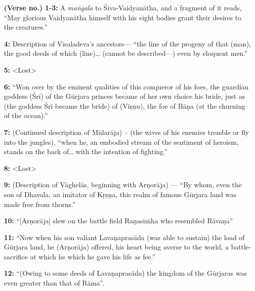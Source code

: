 \noindent
{\bf (Verse no.) 1-3:} A {\sl maṅgala} to Śiva-Vaidyanātha, and a fragment of it reads, “May glorious Vaidyanātha himself with his eight bodies grant their desires to the creatures.”

\noindent
{\bf 4:} Description of Vīsaladeva’s ancestors— “the line of the progeny of that (man), the good deeds of which (line)… (cannot be described—) even by eloquent men.”

\noindent
{\bf 5:} <Lost>

\vfill\eject

\smallskip
\noindent
{\bf 6:} “Won over by the eminent qualities of this conqueror of his foes, the guardian goddess (Śrī) of the Gūrjara princes became of her own choice his bride, just as (the goddess Śrī became the bride) of (Viṣṇu), the foe of Bāṇa (at the churning of the ocean).” 

\smallskip
\noindent
{\bf 7:} (Continued description of Mūlarāja) – (the wives of his enemies tremble or fly into the jungles), “when he, an embodied stream of the sentiment of heroism, stands on the back of… with the intention of fighting.”

\smallskip
\noindent
{\bf 8:} <Lost>

\smallskip
\noindent
{\bf 9:} (Description of Vāghelās, beginning with Arṇorāja) — “By whom, even the son of Dhavala, an imitator of Kṛṣṇa, this realm of famous Gūrjara land was made free from thorns.”

\smallskip
\noindent
{\bf 10:} “[Arṇorāja] slew on the battle field Raṇasiṁha who resembled Rāvaṇa”

\smallskip
\noindent
{\bf 11:} “Now when his son valiant Lavaṇaprasāda  (was able to sustain) the load of Gūrjara land, he (Arṇorāja) offered, his heart being averse to the world, a battle-sacrifice at which he which he gave his life as fee.”

\smallskip
\noindent
{\bf 12:} “(Owing to some deeds of Lavaṇaprasāda) the kingdom of the Gūrjaras was even greater than that of Rāma”. 

